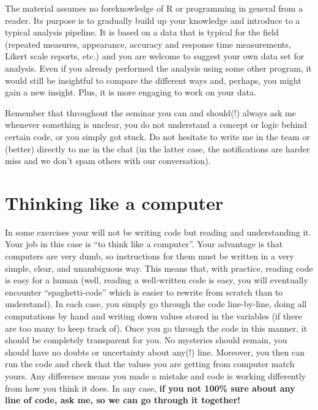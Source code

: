 \documentclass[
]{book}
\begin{document}
The material assumes no foreknowledge of R or programming in general from a reader. Its purpose is to gradually build up your knowledge and introduce to a typical analysis pipeline. It is based on a data that is typical for the field (repeated measures, appearance, accuracy and response time measurements, Likert scale reports, etc.) and you are welcome to suggest your own data set for analysis. Even if you already performed the analysis using some other program, it would still be insightful to compare the different ways and, perhaps, you might gain a new insight. Plus, it is more engaging to work on your data.

Remember that throughout the seminar you can and should(!) always ask me whenever something is unclear, you do not understand a concept or logic behind certain code, or you simply got stuck. Do not hesitate to write me in the team or (better) directly to me in the chat (in the latter case, the notifications are harder miss and we don't spam others with our conversation).

\hypertarget{thinking-like-a-computer}{%
\section*{Thinking like a computer}\label{thinking-like-a-computer}}

In some exercises your will not be writing code but reading and understanding it. Your job in this case is ``to think like a computer''. Your advantage is that computers are very dumb, so instructions for them must be written in a very simple, clear, and unambiguous way. This means that, with practice, reading code is easy for a human (well, reading a well-written code is easy, you will eventually encounter ``spaghetti-code'' which is easier to rewrite from scratch than to understand). In each case, you simply go through the code line-by-line, doing all computations by hand and writing down values stored in the variables (if there are too many to keep track of). Once you go through the code in this manner, it should be completely transparent for you. No mysteries should remain, you should have no doubts or uncertainty about any(!) line. Moreover, you then can run the code and check that the values you are getting from computer match yours. Any difference means you made a mistake and code is working differently from how you think it does. In any case, \textbf{if you not 100\% sure about any line of code, ask me, so we can go through it together!}
\end{document}
